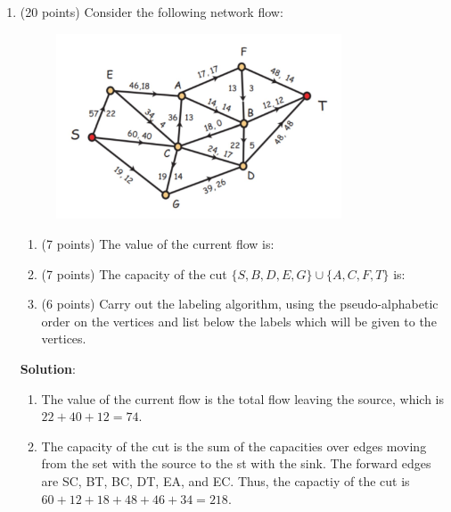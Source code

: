 \documentclass[12pt]{article}
\newenvironment{solution}{
\begin{mdframed}
  { {\bfseries Solution}: }}{
\end{mdframed}}
\begin{document}
\begin{enumerate}
    \pagebreak

    \item (20 points) Consider the following network flow:

    \begin{figure}[H]
      \begin{center}
        \includegraphics[width=0.8\textwidth]{media/Network Flow Final.jpg}
      \end{center}
    \end{figure}

    \begin{enumerate}[label=({\alph*})]
      \item (7 points) The value of the current flow is:

      \item (7 points) The capacity of the cut \(\{S, B, D, E, G\} \cup \{A, C, F, T\}\) is:

      \item (6 points) Carry out the labeling algorithm, using the pseudo-alphabetic order on the vertices and list below the labels which will be given to the vertices.
    \end{enumerate}

    \begin{solution}
      \begin{enumerate}[label=({\alph*})]
        \item The value of the current flow is the total flow leaving the source, which is \(22 + 40 + 12 = 74\).

        \item The capacity of the cut is the sum of the capacities over edges moving from the set with the source to the st with the sink.
        The forward edges are SC, BT, BC, DT, EA, and EC.
        Thus, the capactiy of the cut is \(60 + 12 + 18 + 48 + 46 + 34 = 218\).


\end{enumerate}
\end{solution}
\end{enumerate}
\end{document}
